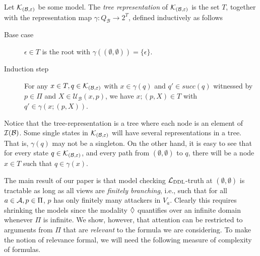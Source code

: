 \documentclass{llncs}
\newcommand{\iterate}[1]{{\cal I}(#1)}
\newcommand{\dlangm}{{\mathcal L}_{\acro{DDL}}}
\newcommand{\carriers}[1]{Q_{#1}}
\newcommand{\kmod}[2]{{\cal K}_{(#1,#2)}}
\newcommand{\update}[3]{{\mathcal U}_{#1}(#2,#3)}
\newcommand{\state}{state }
\newcommand{\views}{\mathcal B}
\newcommand{\sem}{\varepsilon}
\begin{document}
\begin{definition}\label{def:treerep} Let $\kmod \views \sem$ be some model. The \emph{tree representation} of $\kmod \views \sem$ is the set $T$, together with the representation map $\gamma: \carriers \views \to 2^T$, defined inductively as follows
\begin{description}
\item[Base case] $\epsilon \in T$ is the root with $\gamma((\emptyset, \emptyset)) = \{\epsilon\}$.
\item[Induction step] For any $x \in T, q \in \kmod \views \sem$ with $x \in \gamma(q)$ and $q' \in succ(q)$ witnessed by $p \in \Pi$ and $X \in \update \views x p$, we have $x;(p, X) \in T$ with $q' \in \gamma(x;(p,X))$.
\end{description}
\end{definition}

Notice that the tree-representation is a tree where each node is an element of $\iterate \views$. Some single states in $\kmod \views \sem$ will have several representations in a tree. That is, $\gamma(q)$ may not be a singleton. On the other hand, it is easy to see that for every state $q \in \kmod \views \sem$, and every path from $(\emptyset, \emptyset)$ to $q$, there will be a node $x \in T$ such that $q \in \gamma(x)$.

The main result of our paper is that model checking $\dlangm$-truth at $(\emptyset,\emptyset)$ is tractable as long as all views are \emph{finitely branching}, i.e., such that for all $a \in \mathcal A, p \in \Pi$, $p$ has only finitely many attackers in $V_a$. Clearly this requires shrinking the models since the modality $\lozenge$ quantifies over an infinite domain whenever $\Pi$ is infinite. We show, however, that attention can be restricted to arguments from $\Pi$ that are \emph{relevant} to the formula we are considering. To make the notion of relevance formal, we will need the following measure of complexity of formulas.
%
\end{document}
